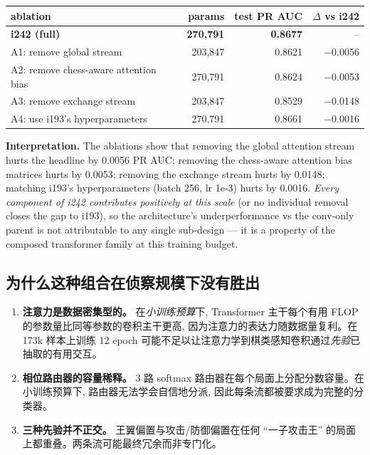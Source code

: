 \documentclass[10pt,a4paper]{article}
\begin{document}
\begin{footnotesize}
\begin{tabularx}{\linewidth}{@{}L r r r@{}}
\toprule
\textbf{ablation} & \textbf{params} & \textbf{test PR AUC} & \textbf{$\Delta$ vs i242} \\
\midrule
\textbf{i242 (full)} & \textbf{270,791} & \textbf{0.8677} & -- \\
A1: remove global stream & 203,847 & 0.8621 & $-$0.0056 \\
A2: remove chess-aware attention bias & 270,791 & 0.8624 & $-$0.0053 \\
A3: remove exchange stream & 203,847 & 0.8529 & $-$0.0148 \\
A4: use i193's hyperparameters & 270,791 & 0.8661 & $-$0.0016 \\
\bottomrule
\end{tabularx}
\end{footnotesize}

\textbf{Interpretation.} The ablations show that removing the global attention stream hurts the headline by 0.0056 PR AUC; removing the chess-aware attention bias matrices hurts by 0.0053; removing the exchange stream hurts by 0.0148; matching i193's hyperparameters (batch 256, lr 1e-3) hurts by 0.0016. \emph{Every component of i242 contributes positively at this scale} (or no individual removal closes the gap to i193), so the architecture's underperformance vs the conv-only parent is not attributable to any single sub-design --- it is a property of the composed transformer family at this training budget.

\subsection{为什么这种组合在侦察规模下没有胜出}

\begin{enumerate}
\item \textbf{注意力是数据密集型的。} 在\emph{小训练预算}下, Transformer 主干每个有用 FLOP 的参数量比同等参数的卷积主干更高, 因为注意力的表达力随数据量复利。在 173k 样本上训练 12 epoch 可能不足以让注意力学到棋类感知卷积通过\emph{先验}已抽取的有用交互。
\item \textbf{相位路由器的容量稀释。} 3 路 softmax 路由器在每个局面上分配分数容量。在小训练预算下, 路由器无法学会自信地分派, 因此每条流都被要求成为完整的分类器。
\item \textbf{三种先验并不正交。} 王翼偏置与攻击/防御偏置在任何 “一子攻击王” 的局面上都重叠。两条流可能最终冗余而非专门化。
\end{enumerate}
\end{document}
